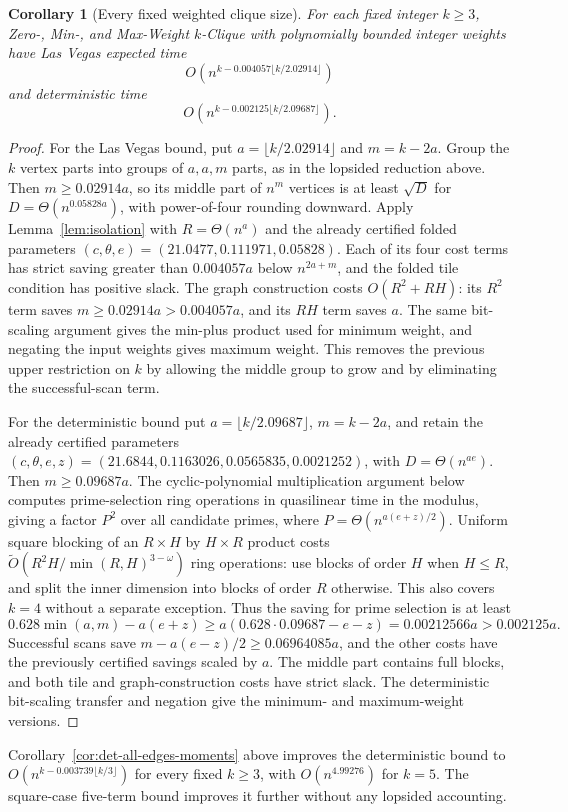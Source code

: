 \documentclass[11pt]{article}
\newtheorem{corollary}[theorem]{Corollary}
\newcommand{\softO}{\widetilde O}
\begin{document}
\begin{corollary}[Every fixed weighted clique size]
\label{cor:all-k}
For each fixed integer $k\ge3$, Zero-, Min-, and Max-Weight $k$-Clique
with polynomially bounded integer weights have Las Vegas expected time
\[
 O\left(n^{k-0.004057\lfloor k/2.02914\rfloor}\right)
\]
and deterministic time
\[
 O\left(n^{k-0.002125\lfloor k/2.09687\rfloor}\right).
\]
\end{corollary}
\begin{proof}
For the Las Vegas bound, put $a=\lfloor k/2.02914\rfloor$ and
$m=k-2a$. Group the $k$ vertex parts into groups of $a,a,m$ parts, as in the
lopsided reduction above. Then $m\ge0.02914a$, so its middle part of
$n^m$ vertices is at least $\sqrt D$ for $D=\Theta(n^{0.05828a})$,
with power-of-four rounding downward. Apply Lemma~\ref{lem:isolation}
with $R=\Theta(n^a)$ and the already certified folded parameters
$(c,\theta,e)=(21.0477,0.111971,0.05828)$. Each of its four cost terms
has strict saving greater than $0.004057a$ below $n^{2a+m}$, and the
folded tile condition has positive slack. The graph construction costs
$O(R^2+RH)$: its $R^2$ term saves $m\ge0.02914a>0.004057a$, and
its $RH$ term saves $a$. The same bit-scaling argument gives the min-plus product used
for minimum weight, and negating the input weights gives maximum weight.
This removes the previous upper restriction on $k$ by allowing the middle
group to grow and by eliminating the successful-scan term.

For the deterministic bound put $a=\lfloor k/2.09687\rfloor$, $m=k-2a$,
and retain the already certified parameters
$(c,\theta,e,z)=(21.6844,0.1163026,0.0565835,0.0021252)$, with
$D=\Theta(n^{ae})$. Then $m\ge0.09687a$. The cyclic-polynomial
multiplication argument below computes prime-selection ring operations in
quasilinear time in the modulus, giving a factor $P^2$ over all candidate
primes, where $P=\Theta(n^{a(e+z)/2})$. Uniform square blocking of an
$R\times H$ by $H\times R$ product costs
$\softO(R^2H/\min(R,H)^{3-\omega})$ ring operations: use blocks of
order $H$ when $H\le R$, and split the inner dimension into blocks of
order $R$ otherwise. This also covers $k=4$ without a separate exception.
Thus the saving for prime selection is at least
\[
 0.628\min(a,m)-a(e+z)
 \ge a(0.628\cdot0.09687-e-z)
 =0.00212566a>0.002125a.
\]
Successful scans save $m-a(e-z)/2\ge0.06964085a$, and the other costs
have the previously certified savings scaled by $a$. The middle part
contains full blocks, and both tile and graph-construction costs have
strict slack. The deterministic bit-scaling transfer and negation give
the minimum- and maximum-weight versions.
\end{proof}
Corollary~\ref{cor:det-all-edges-moments} above improves the deterministic
bound to $O(n^{k-0.003739\lfloor k/3\rfloor})$ for every fixed $k\ge3$,
with $O(n^{4.99276})$ for $k=5$. The square-case five-term bound improves
it further without any lopsided accounting.
\end{document}

